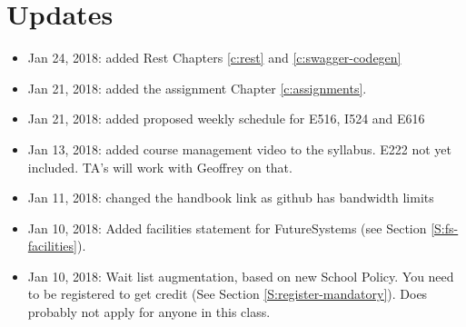 
\chapter{Updates}

\begin{itemize}

\item Jan 24, 2018: added Rest Chapters \ref{c:rest} and \ref{c:swagger-codegen}
 
\item Jan 21, 2018: added the assignment Chapter \ref{c:assignments}.

\item Jan 21, 2018: added proposed weekly schedule for E516, I524 and E616

\item Jan 13, 2018: added course management video to the
  syllabus. E222 not yet included. TA's will work with Geoffrey on that.

\item Jan 11, 2018: changed the handbook link as github has bandwidth limits

\item Jan 10, 2018: Added facilities statement for FutureSystems
  (see Section \ref{S:fs-facilities}).

\item Jan 10, 2018:  Wait list augmentation, based on new School
  Policy. You need to be registered to get credit (See Section
  \ref{S:register-mandatory}). Does probably not apply for anyone in
  this class. 

\end{itemize}

